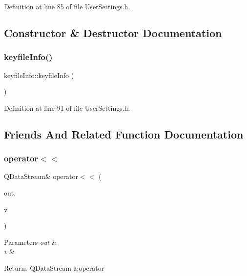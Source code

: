 Definition at line 85 of file User\+Settings.\+h.



\subsection{Constructor \& Destructor Documentation}
\mbox{\label{structkeyfile_info_a5cdee0db7676a1605ef1b82524940bd4}} 
\subsubsection{\texorpdfstring{keyfile\+Info()}{keyfileInfo()}}
{\footnotesize\ttfamily keyfile\+Info\+::keyfile\+Info (\begin{DoxyParamCaption}{ }\end{DoxyParamCaption})\hspace{0.3cm}{\ttfamily [inline]}}



Definition at line 91 of file User\+Settings.\+h.



\subsection{Friends And Related Function Documentation}
\mbox{\label{structkeyfile_info_ac716ea25b9d3f69ac023f0ddda6f8932}} 
\subsubsection{\texorpdfstring{operator$<$$<$}{operator<<}}
{\footnotesize\ttfamily Q\+Data\+Stream\& operator$<$$<$ (\begin{DoxyParamCaption}\item[{Q\+Data\+Stream \&}]{out,  }\item[{const \hyperlink{structkeyfile_info}{keyfile\+Info} \&}]{v }\end{DoxyParamCaption})\hspace{0.3cm}{\ttfamily [friend]}}


\begin{DoxyParams}{Parameters}
{\em out} & \\
\hline
{\em v} & \\
\hline
\end{DoxyParams}
\begin{DoxyReturn}{Returns}
Q\+Data\+Stream \&operator 
\end{DoxyReturn}


